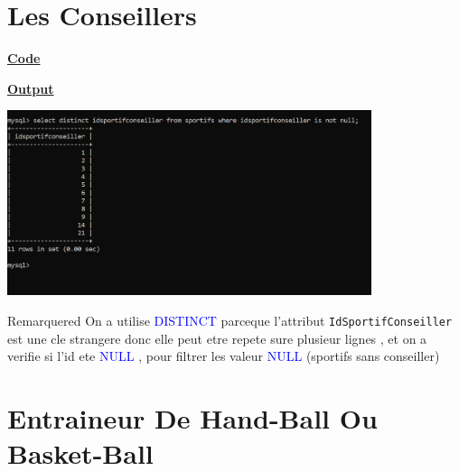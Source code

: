 \newpage

\section{Les Conseillers}
\vspace{0.25cm}
\textbf{\underline{Code}}



\vspace{0.25cm}
\textbf{\underline{Output}}

\vspace{0.25cm}
\begin{center}
    \includegraphics[width=0.8\textwidth]{Parties/Partie3/conseiller.PNG}
\end{center}

\vspace{0.25cm}
\begin{prettyBox}{Remarque}{red}
On a utilise \textcolor{blue}{DISTINCT} parceque l'attribut \texttt{IdSportifConseiller} est une
cle strangere donc elle peut etre repete sure plusieur lignes , et on a verifie si l'id ete \textcolor{blue}{NULL} ,
pour filtrer les valeur \textcolor{blue}{NULL} (sportifs sans conseiller)
\end{prettyBox}

\newpage
\section{Entraineur De Hand-Ball Ou Basket-Ball}

